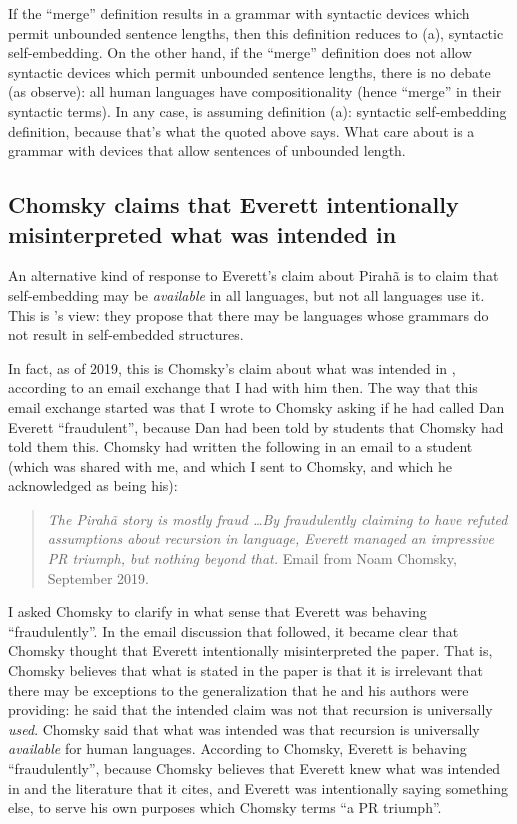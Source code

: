 \documentclass{article}
\begin{document}
If the ``merge'' definition results in a grammar with syntactic devices which permit unbounded sentence lengths, then this definition reduces to (a), syntactic self-embedding. On the other hand, if the ``merge'' definition does not allow syntactic devices which permit unbounded sentence lengths, there is no debate (as \cite{nevins2009evidence} observe): all human languages have compositionality (hence ``merge'' in their syntactic terms). In any case, \cite{everett2005cultural} is assuming definition (a): syntactic self-embedding definition, because that’s what the \cite{hauser2002faculty} quoted above says. What \cite{hauser2002faculty} care about is a grammar with devices that allow sentences of unbounded length.

\subsection{Chomsky claims that Everett intentionally misinterpreted what was intended in \cite{hauser2002faculty}}

An alternative kind of response to Everett’s claim about Pirahã is to claim that self-embedding may be \textit{available} in all languages, but not all languages use it. This is \cite{jackendoff2014what}’s view: they propose that there may be languages whose grammars do not result in self-embedded structures.

In fact, as of 2019, this is Chomsky’s claim about what was intended in \cite{hauser2002faculty}, according to an email exchange that I had with him then. The way that this email exchange started was that I wrote to Chomsky asking if he had called Dan Everett ``fraudulent'', because Dan had been told by students that Chomsky had told them this. Chomsky had written the following in an email to a student (which was shared with me, and which I sent to Chomsky, and which he acknowledged as being his):

\begin{quote}
    \textit{The Pirahã story is mostly fraud \ldots  By fraudulently claiming to have refuted assumptions about recursion in language, Everett managed an impressive PR triumph, but nothing beyond that.}  Email from Noam Chomsky, September 2019.
\end{quote}

I asked Chomsky to clarify in what sense that Everett was behaving ``fraudulently''. In the email discussion that followed, it became clear that Chomsky thought that Everett intentionally misinterpreted the \cite{hauser2002faculty} paper.  That is, Chomsky believes that what is stated in the \cite{hauser2002faculty} paper is that it is irrelevant that there may be exceptions to the generalization that he and his authors were providing: he said that the intended claim was not that recursion is universally \textit{used}. Chomsky said that what was intended was that recursion is universally \textit{available} for human languages. According to Chomsky, Everett is behaving ``fraudulently'', because Chomsky believes that Everett knew what was intended in \cite{hauser2002faculty} and the literature that it cites, and Everett was intentionally saying something else, to serve his own purposes which Chomsky terms ``a PR triumph''. 
\end{document}
